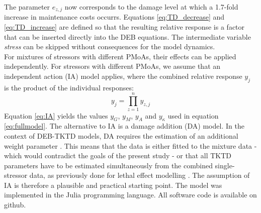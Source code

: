 \documentclass[utf8]{FrontiersinHarvard} %
\begin{document}
The parameter $e_{z,j}$ now corresponds to the damage level at which a 1.7-fold increase in maintenance costs occurrs.  
Equations \ref{eq:TD_decrease} and \ref{eq:TD_increase} are defined so that the resulting relative response is a factor 
that can be inserted directly into the DEB equations. 
The intermediate variable \textit{stress} \citep{jagerRevisitingSimplifiedDEBtox2020}
can be skipped without consequences for the model dynamics. \\
%
For mixtures of stressors with different PMoAs, their effects can be applied independently. 
For stressors with different PMoAs, we assume that an independent action (IA) model applies, 
where the combined relative response $y_j$ is the product of the individual responses: 
%
\begin{equation}
    y_{j} = \prod\limits_{z=1}^{n} y_{z,j}
    \label{eq:IA}
\end{equation}
%
Equation \ref{eq:IA} yields the values $y_G$, $y_M$, $y_A$ and $y_{\kappa}$ used in equation \ref{eq:fullmodel}.
The alternative to IA is a damage addition (DA) model. In the context of DEB-TKTD models, DA requires the estimation 
of an additional weight parameter \citep{jagerBiologybasedApproachMixture2010}. This means that the data is either fitted to the mixture data - 
which would contradict the goals of the present study - or that all TKTD parameters have to be estimated simultaneously 
from the combined single-stressor data, as previously done for lethal effect modelling \citep{bartPredictingMixtureEffects2021}. 
The assumption of IA is therefore a plausible and practical starting point.
%
The model was implemented in the Julia programming language. All software code is available on github. 
%
\end{document}

